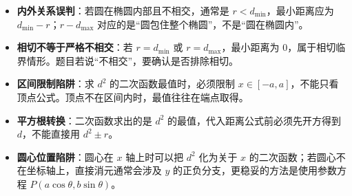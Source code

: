\begin{trapbox}
\begin{itemize}
    \item \textbf{内外关系误判}：若圆在椭圆内部且不相交，通常是 $r<d_{\min}$，最小距离应为 $d_{\min}-r$；$r-d_{\max}$ 对应的是“圆包住整个椭圆”，不是“圆在椭圆内”。
    \item \textbf{相切不等于严格不相交}：若 $r=d_{\min}$ 或 $r=d_{\max}$，最小距离为 $0$，属于相切临界情形。题目若说“不相交”，要确认是否排除相切。
    \item \textbf{区间限制陷阱}：求 $d^2$ 的二次函数最值时，必须限制 $x\in[-a,a]$，不能只看顶点公式。顶点不在区间内时，最值往往在端点取得。
    \item \textbf{平方根转换}：二次函数求出的是 $d^2$ 的最值，代入距离公式前必须先开方得到 $d$，不能直接用 $d^2\pm r$。
    \item \textbf{圆心位置陷阱}：圆心在 $x$ 轴上时可以把 $d^2$ 化为关于 $x$ 的二次函数；若圆心不在坐标轴上，直接消元通常会涉及 $y$ 的正负分支，更稳妥的方法是使用参数方程 $P(a\cos\theta,b\sin\theta)$。
\end{itemize}
\end{trapbox}
